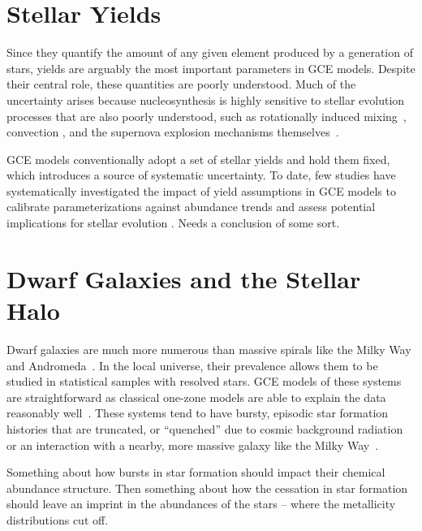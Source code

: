 \documentclass[main.tex]{subfiles}
\begin{document}
\begin{doublespace}
\section{Stellar Yields}
\label{main:sec:intro:yields}

Since they quantify the amount of any given element produced by a generation of
stars, yields are arguably the most important parameters in GCE models.
Despite their central role, these quantities are poorly understood.
Much of the uncertainty arises because nucleosynthesis is highly sensitive to
stellar evolution processes that are also poorly understood, such as
rotationally induced mixing~\citep[e.g.,][]{Frischknecht2016}, convection
\citep[e.g.,][]{Chieffi2001}, and the supernova explosion mechanisms
themselves~\citep[e.g.,][]{Griffith2021b}.
\par
GCE models conventionally adopt a set of stellar yields and hold them fixed,
which introduces a source of systematic uncertainty.
To date, few studies have systematically investigated the impact of yield
assumptions in GCE models to calibrate parameterizations against abundance
trends and assess potential implications for stellar evolution
\citep[e.g.,][]{delosReyes2022, Womack2023}.
{\color{red} Needs a conclusion of some sort.}


\section{Dwarf Galaxies and the Stellar Halo}
\label{main:sec:intro:dwarfs}

Dwarf galaxies are much more numerous than massive spirals like the Milky Way
and Andromeda~\citep[e.g.,][]{Bell2003, Baldry2012}.
In the local universe, their prevalence allows them to be studied in
statistical samples with resolved stars.
GCE models of these systems are straightforward as classical one-zone models
are able to explain the data reasonably well~\citep[see, e.g.,][]{Kirby2011,
delosReyes2022}.
These systems tend to have bursty, episodic star formation histories
\citep[e.g.,][]{Weisz2014a} that are truncated, or ``quenched'' due to cosmic
background radiation or an interaction with a nearby, more massive galaxy like
the Milky Way~\citep[e.g.,][]{Weisz2014b, Weisz2015, Naidu2022}.
\par
{\color{red}
Something about how bursts in star formation should impact their chemical
abundance structure.
Then something about how the cessation in star formation should leave an
imprint in the abundances of the stars -- where the metallicity distributions
cut off.
}


\end{doublespace}
\end{document}
